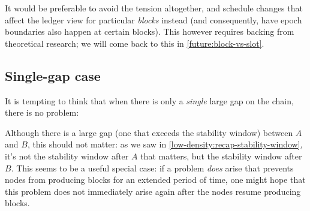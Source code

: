 It would be preferable to avoid the tension altogether, and schedule
changes that affect the ledger view for particular \emph{blocks} instead
(and consequently, have epoch boundaries also happen at certain blocks). This
however requires backing from theoretical research; we will come back to this
in \cref{future:block-vs-slot}.

\subsection{Single-gap case}

It is tempting to think that when there is only a \emph{single} large gap
on the chain, there is no problem:
%
\begin{center}
\end{center}
%
Although there is a large gap (one that exceeds the stability window) between
$A$ and $B$, this should not matter: as we saw in
\cref{low-density:recap-stability-window}, it's not the stability window after
$A$ that matters, but the stability window after $B$. This seems to be a useful
special case: if a problem \emph{does} arise that prevents nodes from producing
blocks for an extended period of time, one might hope that this problem does not
immediately arise again after the nodes resume producing blocks.

